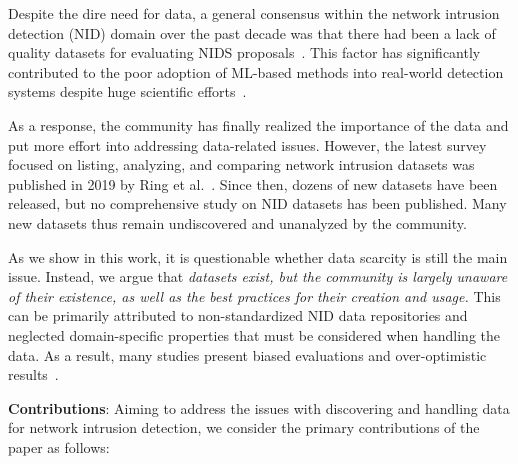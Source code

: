 Despite the dire need for data, a general consensus within the network intrusion detection (NID) domain over the past decade was that there had been a lack of quality datasets for evaluating NIDS proposals~\cite{abt2014_are_we_missing_labels, malowidzki2015_network, silva2022_netsec_datasets_bias}. This factor has significantly contributed to the poor adoption of ML-based methods into real-world detection systems despite huge scientific efforts~\cite{sommer2010_sok_outside}.

As a response, the community has finally realized the importance of the data and put more effort into addressing data-related issues. However, the latest survey focused on listing, analyzing, and comparing network intrusion datasets was published in 2019 by Ring et al.~\cite{ring2019_nids_datasets_survey}. Since then, dozens of new datasets have been released, but no comprehensive study on NID datasets has been published. Many new datasets thus remain undiscovered and unanalyzed by the community.

As we show in this work, it is questionable whether data scarcity is still the main issue. Instead, we argue that \emph{datasets exist, but the community is largely unaware of their existence, as well as the best practices for their creation and usage.} This can be primarily attributed to non-standardized NID data repositories and neglected domain-specific properties that must be considered when handling the data. As a result, many studies present biased evaluations and over-optimistic results~\cite{arp2022_dos_donts_ml_security}.

\textbf{Contributions}: Aiming to address the issues with discovering and handling data for network intrusion detection, we consider the primary contributions of the paper as follows:

